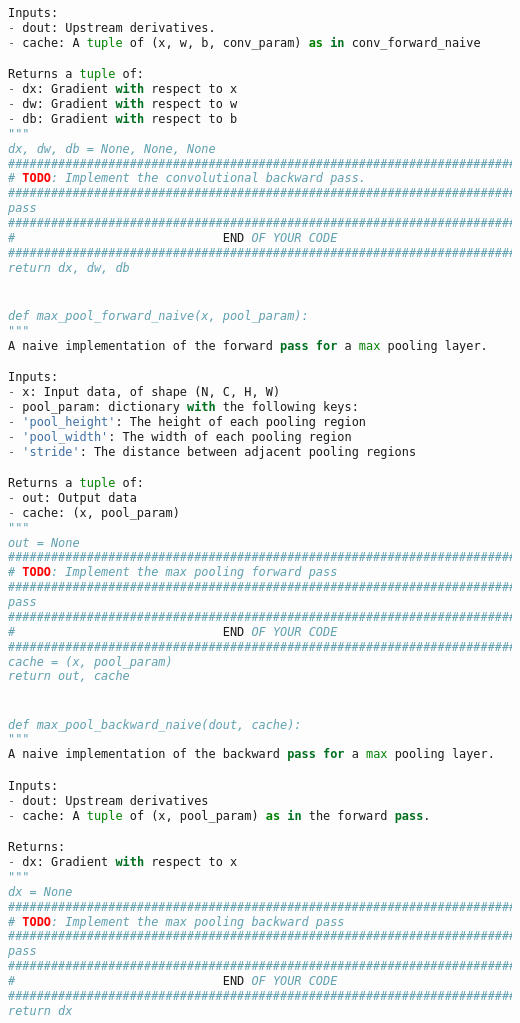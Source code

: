 \begin{lstlisting}[language=Python, label=lst:layers.py, caption={layers.py}, basicstyle=\tiny]
Inputs:
- dout: Upstream derivatives.
- cache: A tuple of (x, w, b, conv_param) as in conv_forward_naive

Returns a tuple of:
- dx: Gradient with respect to x
- dw: Gradient with respect to w
- db: Gradient with respect to b
"""
dx, dw, db = None, None, None
#############################################################################
# TODO: Implement the convolutional backward pass.                          #
#############################################################################
pass
#############################################################################
#                             END OF YOUR CODE                              #
#############################################################################
return dx, dw, db


def max_pool_forward_naive(x, pool_param):
"""
A naive implementation of the forward pass for a max pooling layer.

Inputs:
- x: Input data, of shape (N, C, H, W)
- pool_param: dictionary with the following keys:
- 'pool_height': The height of each pooling region
- 'pool_width': The width of each pooling region
- 'stride': The distance between adjacent pooling regions

Returns a tuple of:
- out: Output data
- cache: (x, pool_param)
"""
out = None
#############################################################################
# TODO: Implement the max pooling forward pass                              #
#############################################################################
pass
#############################################################################
#                             END OF YOUR CODE                              #
#############################################################################
cache = (x, pool_param)
return out, cache


def max_pool_backward_naive(dout, cache):
"""
A naive implementation of the backward pass for a max pooling layer.

Inputs:
- dout: Upstream derivatives
- cache: A tuple of (x, pool_param) as in the forward pass.

Returns:
- dx: Gradient with respect to x
"""
dx = None
#############################################################################
# TODO: Implement the max pooling backward pass                             #
#############################################################################
pass
#############################################################################
#                             END OF YOUR CODE                              #
#############################################################################
return dx



\end{lstlisting}

